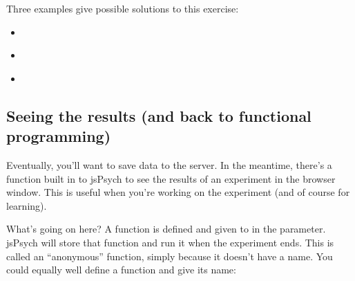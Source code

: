 \documentclass[letterpaper,10pt,english]{sphinxmanual}
\begin{document}
Three examples give possible solutions to this exercise:
\begin{itemize}
\item {} 
{\hyperref[\detokenize{stroop_loop:stroop-loop}]{}}

\item {} 
{\hyperref[\detokenize{stroop_timeline_variables:stroop-timeline-variables}]{}}

\item {} 
{\hyperref[\detokenize{stroop_functions:stroop-functions}]{}}

\end{itemize}


\subsection{Seeing the results (and back to functional programming)}
\label{\detokenize{jspsych_au:seeing-the-results-and-back-to-functional-programming}}
Eventually, you’ll want to save data to the server. In the meantime, there’s a
function built in to jsPsych to see the
results of an experiment in the browser window. This is useful when you’re
working on the experiment (and of course for learning).

\begin{sphinxVerbatim}[commandchars=\\\{\}]
     \PYG{p}{[}\PYG{p}{]}
      
\end{sphinxVerbatim}

What’s going on here? A function is defined and given to  in the
 parameter. jsPsych will store that function and run it when the
experiment ends. This is called an “anonymous” function, simply because it
doesn’t have a name. You could equally well define a function and give its name:
\end{document}
